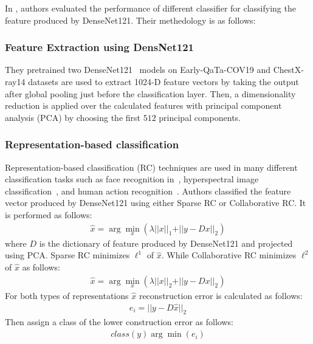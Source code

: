In \cite{ar}, authors evaluated the performance of different classifier for classifying the feature produced by DenseNet121. Their methedology is as follows:
\subsubsection{Feature Extraction using DensNet121}
They pretrained two DenseNet121~\cite{huang2017densely} models on Early-QaTa-COV19 and ChestX-ray14 datasets are used to extract 1024-D feature vectors by taking the output after global pooling just before the classification layer. Then, a dimensionality reduction is applied over the calculated features with principal component analysis (PCA) by choosing the first $512$ principal components.

\subsubsection{Representation-based classification}
 Representation-based classification (RC) techniques are used in many different classification tasks such as face recognition in~\cite{wright2010sparse}, hyperspectral image classification~\cite{li2016survey}, and human action recognition~\cite{guha2011learning}. Authors classified the feature vector produced by DenseNet121 using either Sparse RC or Collaborative RC. It is performed as follows:
 \begin{equation}
    \begin{split}
        \hat{x} = \arg \min_{x}(\lambda \vert \vert x \vert\vert_{1} + \vert\vert y - Dx \vert\vert_{2})
    \end{split}
\end{equation}
where $D$ is the dictionary of feature produced by DenseNet121 and projected using PCA. Sparse RC minimizes $\ell^{1}$ of $\hat{x}$. While Collaborative RC minimizes $\ell^{2}$ of $\hat{x}$ as follows:
\begin{equation}
    \begin{split}
        \hat{x} = \arg \min_{x}(\lambda \vert \vert x \vert\vert_{2} + \vert\vert y - Dx \vert\vert_{2})
    \end{split}
\end{equation}
For both types of representations $\hat{x}$ reconstruction error is calculated as follows:
\begin{equation}
    \begin{split}
        e_i = \vert\vert y - D\hat{x} \vert\vert_2
    \end{split}
\end{equation}
Then assign a class of the lower construction error as follows:
\begin{equation}
    \begin{split}
        class(y) \arg \min(e_i)
    \end{split}
\end{equation}

